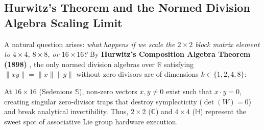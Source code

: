 \documentclass[11pt,a4paper]{article}
\begin{document}
\subsection{Hurwitz's Theorem and the Normed Division Algebra Scaling Limit}
A natural question arises: \textit{what happens if we scale the $2\times 2$ block matrix element to $4\times 4$, $8\times 8$, or $16\times 16$?} By \textbf{Hurwitz's Composition Algebra Theorem (1898)} \cite{hurwitz1898composition}, the only normed division algebras over $\mathbb{R}$ satisfying $\|xy\| = \|x\|\|y\|$ without zero divisors are of dimensions $k \in \{1, 2, 4, 8\}$:
\begin{table}[htbp]
\centering
\caption{The Hurwitz Normed Division Algebra Ladder for $k\times k$ block-rotor neural layers (total state dimension $D = kN$).}
\label{tab:hurwitz_ladder}
\vspace{0.3em}
\end{table}

At $16\times 16$ (Sedenions $\mathbb{S}$), non-zero vectors $x, y \neq 0$ exist such that $x \cdot y = 0$, creating singular zero-divisor traps that destroy symplecticity ($\det(W) = 0$) and break analytical invertibility. Thus, $2\times 2$ ($\mathbb{C}$) and $4\times 4$ ($\mathbb{H}$) represent the sweet spot of associative Lie group hardware execution.
\end{document}
